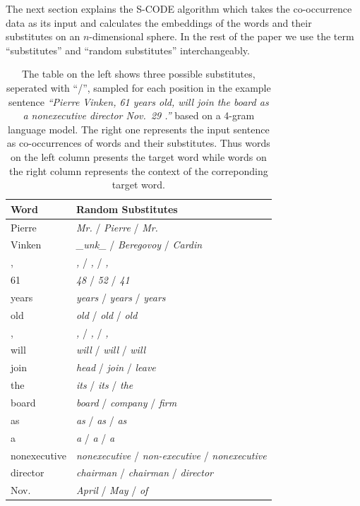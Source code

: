 The next section explains the S-CODE algorithm which takes the
co-occurrence data as its input and calculates the embeddings of the
words and their substitutes on an $n$-dimensional sphere.  In the rest
of the paper we use the term ``substitutes'' and ``random
substitutes'' interchangeably.

\begin{table}[ht]
  \caption{The table on the left shows three possible substitutes, seperated
    with ``/'', sampled for each position in the example sentence
    \textit{``Pierre Vinken, 61 years old, will join the board as a
      nonexecutive director Nov.~29 .''} based on a 4-gram language
    model.  The right one represents the input sentence as
    co-occurrences of words and their substitutes.  Thus words on the
    left column presents the target word while words on the right column
    represents the context of the correponding target word.}
\begin{tabular}{|ll|} \hline
\textbf{Word} & \textbf{Random Substitutes}\\
\hline
Pierre & \textit{Mr.}  / \textit{Pierre} /  \textit{Mr.}\\
Vinken & \textit{\_unk\_} / \textit{Beregovoy} / \textit{Cardin}\\
, & \textit{,} / \textit{,} / \textit{,}\\
61 & \textit{48} / \textit{52} / \textit{41}\\
years & \textit{years} /  \textit{years} /  \textit{years}\\
old & \textit{old} /  \textit{old} /  \textit{old}\\
, & \textit{,} /  \textit{,} /  \textit{,}\\
will & \textit{will} /  \textit{will} /  \textit{will}\\
join & \textit{head} /  \textit{join} /  \textit{leave}\\
the  & \textit{its} /  \textit{its} /  \textit{the}\\
board & \textit{board} /  \textit{company} / \textit{firm}\\
as & \textit{as} / \textit{as} / \textit{as}\\
a & \textit{a} / \textit{a} / \textit{a}\\
nonexecutive & \textit{nonexecutive} / \textit{non-executive} / \textit{nonexecutive}\\
director & \textit{chairman} / \textit{chairman} / \textit{director}\\
Nov. & \textit{April} / \textit{May} / \textit{of}\\

\end{tabular}
\end{table}
